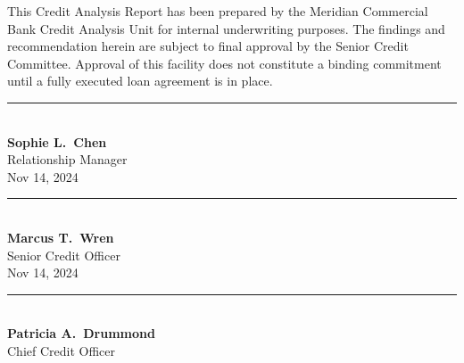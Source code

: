 \documentclass[11pt,a4paper]{article}
\begin{document}
\begin{tcolorbox}[
  enhanced, arc=3pt,
  colback=white, colframe=NavyInk,
  boxrule=0.8pt,
  top=10pt, bottom=12pt, left=12pt, right=12pt,
]
  {\small\color{SlateGray}
  This Credit Analysis Report has been prepared by the Meridian Commercial Bank Credit Analysis
  Unit for internal underwriting purposes. The findings and recommendation herein are subject to
  final approval by the Senior Credit Committee. Approval of this facility does not constitute a
  binding commitment until a fully executed loan agreement is in place.}

  \vspace{10pt}

  \noindent
  \begin{minipage}[t]{0.28\textwidth}
    \vspace{0pt}
    \centering
    \vspace{20pt}
    \textcolor{MidRule}{\rule{\linewidth}{0.5pt}}\\[2pt]
    {\small\bfseries Sophie L.\ Chen}\\
    {\scriptsize\color{SlateGray} Relationship Manager}\\
    {\scriptsize\color{SlateGray} \faCalendar\enspace Nov 14, 2024}
  \end{minipage}%
  \hfill
  \begin{minipage}[t]{0.28\textwidth}
    \vspace{0pt}
    \centering
    \vspace{20pt}
    \textcolor{MidRule}{\rule{\linewidth}{0.5pt}}\\[2pt]
    {\small\bfseries Marcus T.\ Wren}\\
    {\scriptsize\color{SlateGray} Senior Credit Officer}\\
    {\scriptsize\color{SlateGray} \faCalendar\enspace Nov 14, 2024}
  \end{minipage}%
  \hfill
  \begin{minipage}[t]{0.28\textwidth}
    \vspace{0pt}
    \centering
    \vspace{20pt}
    \textcolor{MidRule}{\rule{\linewidth}{0.5pt}}\\[2pt]
    {\small\bfseries Patricia A.\ Drummond}\\
    {\scriptsize\color{SlateGray} Chief Credit Officer}\\
    {\scriptsize\color{SlateGray} \faCalendar\enspace \underline{\hspace{30pt}}}
  \end{minipage}


\end{tcolorbox}
\end{document}
